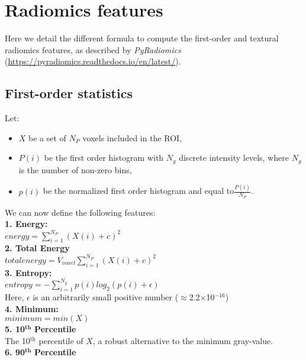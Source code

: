 \chapter{Radiomics features}\label{appendix---radiomicsFeatures}

Here we detail the different formula to compute the first-order and textural radiomics features, as described by \textit{PyRadiomics} (\url{https://pyradiomics.readthedocs.io/en/latest/}).

\newcommand*\mean[1]{\overline{#1}}

\section{First-order statistics}

Let:
\begin{itemize}
\item $X$ be a set of $N_{P}$ voxels included in the ROI,
\item 
 $P\left(i\right)$ be the first order histogram with $N_{g}$ discrete intensity levels, where $N_{g}$ is the number of non-zero bins,
\item $p\left(i\right)$ be the normalized first order histogram and equal to$\frac{P\left(i\right)}{N_{P}}$.
\end{itemize}
We can now define the following features: \\
\textbf{1. Energy:}\\
$\textit{energy}=\sum _{i=1}^{N_{P}}\left(X\left(i\right)+c\right)^{2}$\\
\textbf{2. Total Energy}\\
$\textit{totalenergy}=V_{\textit{voxel}}\sum _{i=1}^{N_{P}}\left(X\left(i\right)+c\right)^{2}$ \\
\textbf{3. Entropy:}\\
$\textit{entropy}=-\sum _{i=1}^{N_{g}}p\left(i\right)log_{2}\left(p\left(i\right)+\epsilon \right)$ \\
Here, $\epsilon $ is an arbitrarily small positive number (${\approx}$2.2${\times}$10$^{-16}$) \\
\textbf{4. Minimum:}\\
$\textit{minimum}=min \left(X\right)$\\
\textbf{5. 10}$^{\mathbf{th}}$ \textbf{Percentile}\\
The 10$^{\mathrm{th}}$ percentile of $X$, a robust alternative to the minimum gray-value.\\
\textbf{6. 90}$^{\mathbf{th}}$ \textbf{Percentile}\\
